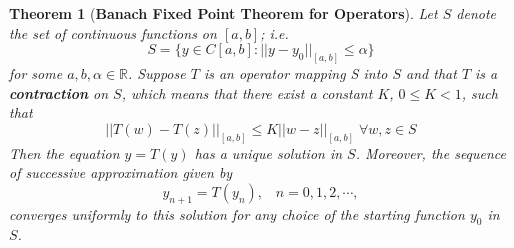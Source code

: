 \documentclass{article}
\newtheorem{theorem}{Theorem}[section]
\theoremstyle{definition}
\theoremstyle{remark}
\theoremstyle{example}
\begin{document}
\begin{theorem}[\textbf{Banach Fixed Point Theorem for Operators}]\cite{r_kent_nagle_fundamentals_2011}\label{thm:BFPTO}
    Let $S$ denote the set of continuous functions on $[a,b]$; i.e.
    \begin{equation}
        S = \{y\in C[a,b]:\lvert\lvert y - y_0\rvert\rvert_{[a,b]} \leq \alpha\}
    \end{equation}
    for some $a, b, \alpha\in \mathbb{R}$. Suppose $T$ is an operator mapping S into $S$ and that $T$ is a \textbf{contraction} on $S$, which means that there exist a constant $K$, $0\leq K < 1$, such that 
\begin{equation}\label{eqn:contractionO}
    \lvert\lvert T(w) - T(z) \rvert\rvert_{[a,b]} \leq K\lvert\lvert w - z \rvert\rvert_{[a,b]}\; \forall w,z \in S
\end{equation}
Then the equation $y = T(y)$ has a unique solution in $S$. Moreover, the sequence of successive approximation given by
\begin{equation}\label{eqn:ssoex}
    y_{n+1} = T(y_n), \; \; \; n = 0, 1, 2, \cdots,
\end{equation}
converges uniformly to this solution for any choice of the starting function $y_0$ in $S$.
\end{theorem}
\end{document}

